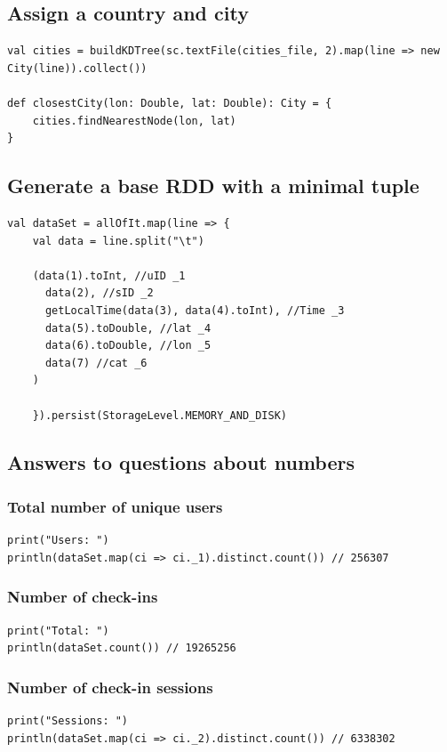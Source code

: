 \documentclass[abstract=on]{article}
\begin{document}
\subsection{Assign a country and city}
\begin{lstlisting}
val cities = buildKDTree(sc.textFile(cities_file, 2).map(line => new City(line)).collect())

def closestCity(lon: Double, lat: Double): City = {
    cities.findNearestNode(lon, lat)
}
\end{lstlisting}

\subsection{Generate a base RDD with a minimal tuple}
\begin{lstlisting}
val dataSet = allOfIt.map(line => {
    val data = line.split("\t")

    (data(1).toInt, //uID _1
      data(2), //sID _2
      getLocalTime(data(3), data(4).toInt), //Time _3
      data(5).toDouble, //lat _4
      data(6).toDouble, //lon _5
      data(7) //cat _6
    )

    }).persist(StorageLevel.MEMORY_AND_DISK)
\end{lstlisting}

\subsection{Answers to questions about numbers}
\subsubsection{Total number of unique users}
\begin{lstlisting}
print("Users: ")
println(dataSet.map(ci => ci._1).distinct.count()) // 256307
\end{lstlisting}

\subsubsection{Number of check-ins}
\begin{lstlisting}
print("Total: ")
println(dataSet.count()) // 19265256
\end{lstlisting}

\subsubsection{Number of check-in sessions}
\begin{lstlisting}
print("Sessions: ") 
println(dataSet.map(ci => ci._2).distinct.count()) // 6338302
\end{lstlisting}
\end{document}
